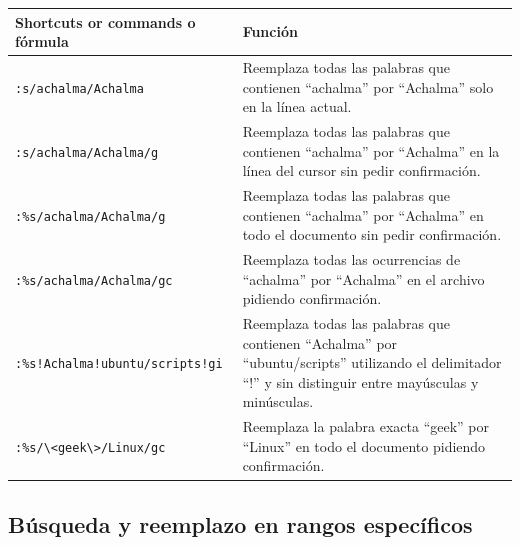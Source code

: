 \documentclass[
  doc,
  floatsintext,
  longtable,
  a4paper,
  nolmodern,
  notxfonts,
  notimes,
  12pt,
  colorlinks=true,linkcolor=blue,citecolor=blue,urlcolor=blue]{apa7}
\newcounter{none} %
\begin{document}
{\def\LTcaptype{none} %
\begin{longtable}[]{@{}
  >{\raggedright\arraybackslash}p{}
  >{\raggedright\arraybackslash}p{}@{}}
\toprule\noalign{}
\begin{minipage}[b]{\linewidth}\raggedright
Shortcuts or commands o fórmula
\end{minipage} & \begin{minipage}[b]{\linewidth}\raggedright
Función
\end{minipage} \\
\midrule\noalign{}
\endhead
\bottomrule\noalign{}
\endlastfoot
\texttt{:s/achalma/Achalma} & Reemplaza todas las palabras que contienen
``achalma'' por ``Achalma'' solo en la línea actual. \\
\texttt{:s/achalma/Achalma/g} & Reemplaza todas las palabras que
contienen ``achalma'' por ``Achalma'' en la línea del cursor sin pedir
confirmación. \\
\texttt{:\%s/achalma/Achalma/g} & Reemplaza todas las palabras que
contienen ``achalma'' por ``Achalma'' en todo el documento sin pedir
confirmación. \\
\texttt{:\%s/achalma/Achalma/gc} & Reemplaza todas las ocurrencias de
``achalma'' por ``Achalma'' en el archivo pidiendo confirmación. \\
\texttt{:\%s!Achalma!ubuntu/scripts!gi} & Reemplaza todas las palabras
que contienen ``Achalma'' por ``ubuntu/scripts'' utilizando el
delimitador ``!'' y sin distinguir entre mayúsculas y minúsculas. \\
\texttt{:\%s/\textbackslash{}\textless{}geek\textbackslash{}\textgreater{}/Linux/gc}
& Reemplaza la palabra exacta ``geek'' por ``Linux'' en todo el
documento pidiendo confirmación. \\
\end{longtable}
}

\subsection{Búsqueda y reemplazo en rangos
específicos}\label{buxfasqueda-y-reemplazo-en-rangos-especuxedficos}
\end{document}
